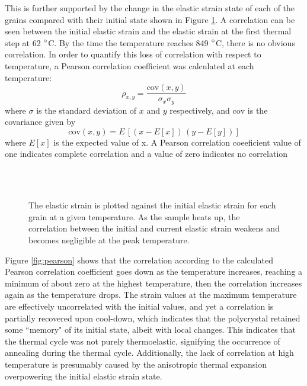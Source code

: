 \documentclass[3p]{elsarticle}
\begin{document}
	This is further supported by the change in the elastic strain state of each of the grains compared with their initial state shown in Figure \ref{fig:elastic_change}. A correlation can be seen between the initial elastic strain and the elastic strain at the first thermal step at 62 $\degree$C. By the time the temperature reaches 849 $\degree$C, there is no obvious correlation. In order to quantify this loss of correlation with respect to temperature, a Pearson correlation coef{}ficient was calculated at each temperature:
	\begin{equation}
		\rho_{x,y} = \frac{\mathrm{cov}(x,y)}{\sigma_x \sigma_y}
	\end{equation}
	where $\sigma$ is the standard deviation of $x$ and $y$ respectively, and $\mathrm{cov}$ is the covariance given by
	\begin{equation}
		\mathrm{cov}(x,y) = E \, [(x-E[x]) \, (y-E[y])]
	\end{equation}
	where $E[x]$ is the expected value of x. A Pearson correlation coeeficient value of one indicates complete correlation and a value of zero indicates no correlation
	
	
	
	\begin{figure}
		\centering
		 \\
		 \\
		\caption{The elastic strain is plotted against the initial elastic strain for each grain at a given temperature. As the sample heats up, the correlation between the initial and current elastic strain weakens and becomes negligible at the peak temperature.}
		\label{fig:elastic_change}
	\end{figure}

	Figure \ref{fig:pearson} shows that the correlation according to the calculated Pearson correlation coef{}ficient goes down as the temperature increases, reaching a minimum of about zero at the highest temperature, then the correlation increases again as the temperature drops. The strain values at the maximum temperature are effectively uncorrelated with the initial values, and yet a correlation is partially recovered upon cool-down, which indicates that the polycrystal retained some ``memory" of its initial state, albeit with local changes. This indicates that the thermal cycle was not purely thermoelastic, signifying the occurrence of annealing during the thermal cycle. Additionally, the lack of correlation at high temperature is presumably caused by the anisotropic thermal expansion overpowering the initial elastic strain state.
	
\end{document}
